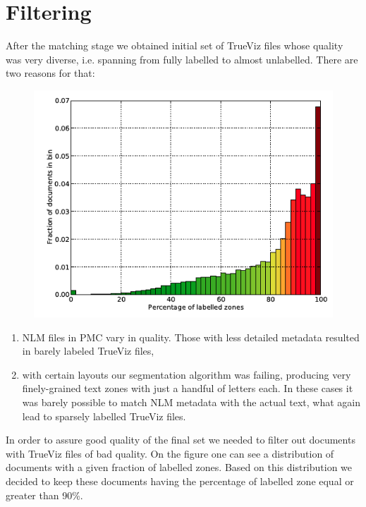 \section{Filtering}
After the matching stage we obtained initial set of TrueViz files whose quality was very diverse, i.e. spanning from fully labelled to almost unlabelled. There are two reasons for that:
\begin{figure}[ht!]
  \centering
  \includegraphics[width=12cm]{plots/zone_coverage_grotoap2}
  \label{fig:trueviz_match_histogram}
\end{figure}
\begin{enumerate}
\item NLM files in PMC vary in quality. Those with less detailed metadata resulted in barely labeled TrueViz files,
\item with certain layouts our segmentation algorithm was failing, producing very finely-grained text zones with just a handful of letters each. In these cases it was barely possible to match NLM metadata with the actual text, what again lead to sparsely labelled TrueViz files. 
\end{enumerate}
In order to assure good quality of the final set we needed to filter out documents with TrueViz files of bad quality. On the figure \label{fig:trueviz_match_histogram} one can see a distribution of documents with a given fraction of labelled zones.
Based on this distribution we decided to keep these documents having the percentage of labelled zone equal or greater than 90\%.

